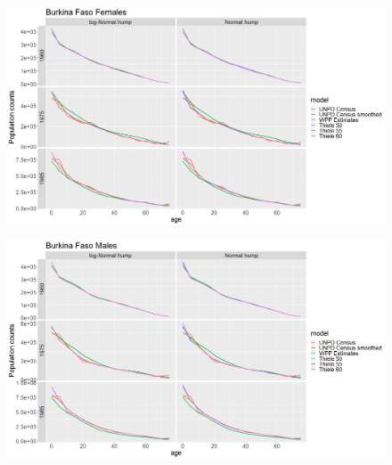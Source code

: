 \documentclass[12pt,a4paper]{article}
\begin{document}
\newpage
\begin{figure}[H]
\includegraphics[width = \linewidth]{pop females.png}
\end{figure}
\begin{figure}[H]
\includegraphics[width = \linewidth]{pop males.png}
\end{figure}
\end{document}
